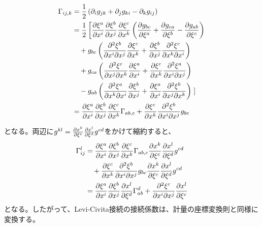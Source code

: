 \documentclass[a4paper,11pt]{jsarticle}
\numberwithin{equation}{section}
\begin{document}
\begin{align}
    \Gamma_{ij,k} &= \frac{1}{2} \left( \partial_i g_{jk} + \partial_j g_{ki} - \partial_k g_{ij} \right) \\
    &= \frac{1}{2} \left[ \pdv{\xi^a}{x^i} \pdv{\xi^b}{x^j} \pdv{\xi^c}{x^k} \left( \pdv{g_{bc}}{\xi^a} + \pdv{g_{ca}}{\xi^b} - \pdv{g_{ab}}{\xi^c} \right) \right. \\
    &\quad + g_{bc} \left( \pdv[2]{\xi^b}{x^i}{x^j} \pdv{\xi^c}{x^k} + \pdv{\xi^b}{x^j} \pdv[2]{\xi^c}{x^k}{x^i} \right) \\
    &\quad + g_{ca} \left( \pdv[2]{\xi^c}{x^j}{x^k} \pdv{\xi^a}{x^i} + \pdv{\xi^c}{x^k} \pdv[2]{\xi^a}{x^i}{x^j} \right) \\
    &\quad - g_{ab} \left( \pdv[2]{\xi^a}{x^k}{x^i} \pdv{\xi^b}{x^j} + \pdv{\xi^a}{x^i} \pdv[2]{\xi^b}{x^j}{x^k} \right) \left. \right] \\
    &= \pdv{\xi^a}{x^i} \pdv{\xi^b}{x^j} \pdv{\xi^c}{x^k} \Gamma_{ab,c} + \pdv{\xi^c}{x^k} \pdv[2]{\xi^b}{x^i}{x^j} g_{bc}
\end{align}

となる。両辺に$g^{kl}=\pdv{x^k}{\xi^c}\pdv{x^l}{\xi^d}g^{cd}$をかけて縮約すると、
\begin{align}
    \Gamma_{ij}^l &= \pdv{\xi^a}{x^i} \pdv{\xi^b}{x^j} \pdv{\xi^c}{x^k} \Gamma_{ab,c}\pdv{x^k}{\xi^c}\pdv{x^l}{\xi^d}g^{cd}\\
    &\quad + \pdv{\xi^c}{x^k} \pdv[2]{\xi^b}{x^i}{x^j}g_{bc}\pdv{x^k}{\xi^c}\pdv{x^l}{\xi^d}g^{cd}\\
    &= \pdv{\xi^a}{x^i} \pdv{\xi^b}{x^j} \pdv{x^l}{\xi^d} \Gamma_{ab}^d + \pdv[2]{\xi^c}{x^i}{x^j}\pdv{x^l}{\xi^c}
\end{align}
となる。したがって、Levi-Civita接続の接続係数は、計量の座標変換則と同様に変換する。\hfill\qedsymbol
\end{document}
